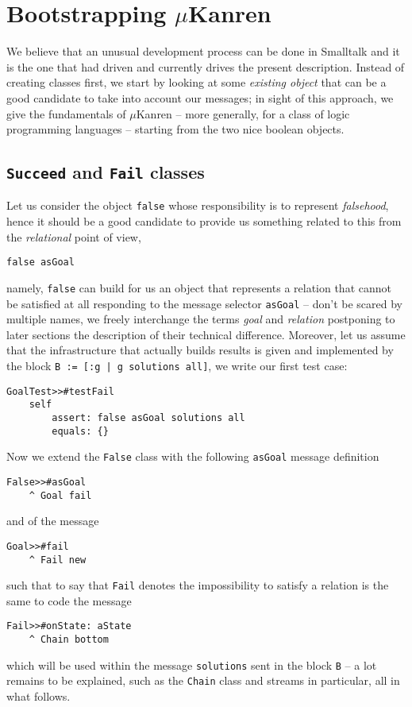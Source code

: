 \documentclass[a4paper,12pt]{article}
\begin{document}
\section{Bootstrapping $\mu$Kanren}

We believe that an unusual development process can be done in Smalltalk and it
is the one that had driven and currently drives the present description.
Instead of creating classes first, we start by looking at some \textit{existing
object} that can be a good candidate to take into account our messages; in
sight of this approach, we give the fundamentals of $\mu$Kanren -- more
generally, for a class of logic programming languages -- starting from the two
nice boolean objects.

\subsection{\texttt{Succeed} and \texttt{Fail} classes}

Let us consider the object \Verb|false| whose responsibility is to represent
\textit{falsehood}, hence it should be a good candidate to provide us something
related to this from the \textit{relational} point of view,
\begin{verbatim}
false asGoal
\end{verbatim}
namely, \Verb|false| can build for us an object that represents a relation that
cannot be satisfied at all responding to the message selector \Verb|asGoal| --
don't be scared by multiple names, we freely interchange the terms
\textit{goal} and \textit{relation} postponing to later sections the
description of their technical difference. Moreover, let us
assume that the infrastructure that actually builds results is given and implemented
by the block \texttt{B := [:g | g solutions all]}, we write our first test case:
\begin{verbatim}
GoalTest>>#testFail
    self
        assert: false asGoal solutions all
        equals: {}
\end{verbatim}
Now we extend the \Verb|False| class with the following \Verb|asGoal| message
definition
\begin{verbatim}
False>>#asGoal
    ^ Goal fail
\end{verbatim}
and of the message
\begin{verbatim}
Goal>>#fail
    ^ Fail new
\end{verbatim}
such that to say that \verb|Fail| denotes the impossibility to satisfy a relation
is the same to code the message
\begin{verbatim}
Fail>>#onState: aState
    ^ Chain bottom
\end{verbatim}
which will be used within the message \Verb|solutions| sent in the block
\Verb|B| -- a lot remains to be explained, such as the \Verb|Chain| class and
streams in particular, all in what follows.
\end{document}

